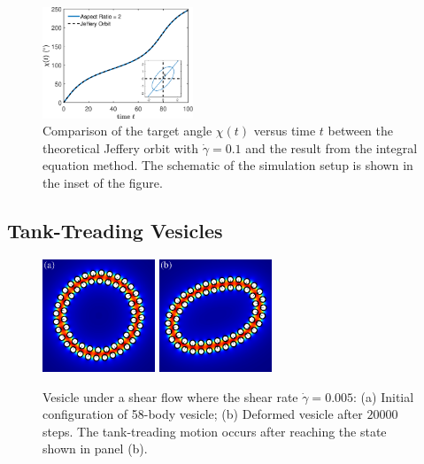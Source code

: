 \documentclass[lineno]{jfm}
\begin{document}
\begin{figure}[H]
\begin{center}
\includegraphics[width=0.4\textwidth]{JefferyOrbit.eps}
\end{center}
  \caption{Comparison of the target angle $\chi(t)$ versus time $t$ between the theoretical Jeffery orbit with $\dot\gamma=0.1$ and the result from the integral equation method. The schematic of the simulation setup is shown in the inset of the figure.
  }
    \label{figure1}
\end{figure}



\subsection{Tank-Treading Vesicles}

\begin{figure}
\begin{center}
\includegraphics[width=0.3\textwidth]{N58_0.eps}
\includegraphics[width=0.3\textwidth]{N58_20000.eps}
\end{center}
  \caption{Vesicle under a shear flow where the shear rate $\dot\gamma=0.005$: 
  (a) Initial configuration of 58-body vesicle; (b) Deformed vesicle after $20000$ steps. The tank-treading motion occurs after reaching the state shown in panel (b).
  }
    \label{figure2}
\end{figure}
%
\end{document}
